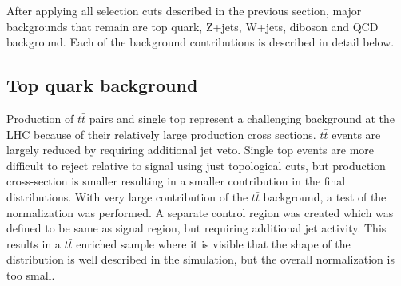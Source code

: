 After applying all selection cuts described in the previous section, major backgrounds that remain are top quark, Z+jets, W+jets, diboson and QCD background. Each of the background contributions is described in detail below. 


\subsection{Top quark background}

Production of $t\bar{t}$ pairs and single top represent a challenging background at the LHC because of their relatively large production cross sections. $t\bar{t}$ events are largely reduced by requiring additional jet veto. Single top events are more difficult to reject relative to signal using just topological cuts, but production cross-section is smaller resulting in a smaller contribution in the final distributions.
With very large contribution of the $t\bar{t}$ background, a test of the normalization was performed. A separate control region was created which was defined to be same as signal region, but requiring additional jet activity. This results in a $t\bar{t}$ enriched sample where it is visible that the shape of the distribution is well described in the simulation, but the overall normalization is too small. 
